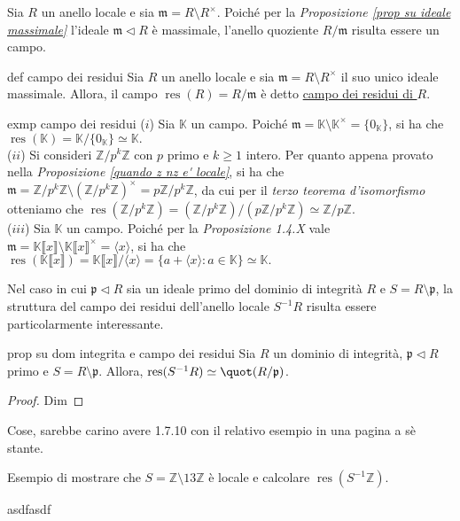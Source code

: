 \noindent Sia $R$ un anello locale e sia $\mathfrak{m}=R\setminus R^{\times}$. Poiché per la \emph{Proposizione \ref{prop su ideale massimale}} 
l'ideale $\mathfrak{m}\lhd R$ è massimale, l'anello quoziente $R/\mathfrak{m}$ risulta essere un campo.

\begin{defn}{def campo dei residui}
Sia $R$ un anello locale e sia $\mathfrak{m}=R\setminus R^{\times}$ il suo unico ideale massimale. Allora, il campo $\operatorname{res}(R)=R/\mathfrak{m}$ è detto \underline{campo dei residui di $R$}.
\end{defn}

\begin{example}[]{exmp campo dei residui}
  ($i$) Sia $\mathbb{K}$ un campo. Poiché $\mathfrak{m}=\mathbb{K}\setminus \mathbb{K}^{\times}=\{0_{\mathbb{K}}\}$, si ha che 
  $\operatorname{res}(\mathbb{K})=\mathbb{K}/\{0_{\mathbb{K}}\}\simeq \mathbb{K}.$\\

  \noindent ($ii$) Si consideri $\mathbb{Z}/p^k\mathbb{Z}$ con $p$ primo e $k\geq 1$ intero. Per quanto appena provato nella 
  \emph{Proposizione \ref{quando z nz e' locale}}, si ha che $\mathfrak{m}=\mathbb{Z}/p^k\mathbb{Z}\setminus 
  (\mathbb{Z}/p^k\mathbb{Z})^{\times}=p\mathbb{Z}/p^k\mathbb{Z}$, da cui per il \emph{terzo teorema d'isomorfismo} otteniamo che 
  $\operatorname{res}(\mathbb{Z}/p^k\mathbb{Z})=(\mathbb{Z}/p^k\mathbb{Z})/(p\mathbb{Z}/p^k\mathbb{Z})\simeq \mathbb{Z}/p\mathbb{Z}.$ \\

  \noindent ($iii$) Sia $\mathbb{K}$ un campo. Poiché per la \emph{Proposizione 1.4.X} vale 
  $\mathfrak{m}=\mathbb{K}\llbracket x\rrbracket\setminus\mathbb{K}\llbracket x\rrbracket^{\times}=\langle x \rangle$, si ha che 
  $\operatorname{res}(\mathbb{K}\llbracket x\rrbracket)=\mathbb{K}\llbracket x\rrbracket/\langle x\rangle = 
  \{a+\langle x\rangle : a\in \mathbb{K}\}\simeq \mathbb{K}.$
\end{example}

\noindent Nel caso in cui $\mathfrak{p}\lhd R$ sia un ideale primo del dominio di integrità $R$ e $S=R\setminus \mathfrak{p}$, 
la struttura del campo dei residui dell'anello locale $S^{-1}R$ risulta essere particolarmente interessante.

\begin{prop}[1.7.10]{prop su dom integrita e campo dei residui}
Sia $R$ un dominio di integrità, $\mathfrak{p}\lhd R$ primo e $S=R\setminus \mathfrak{p}$. Allora, $\operatorname{res}(S^{-1}R)\simeq \quot(R/\mathfrak{p})$.
\end{prop}
\vspace{-4mm}
\begin{proof}
Dim
\end{proof}

\noindent Cose, sarebbe carino avere 1.7.10 con il relativo esempio in una pagina a sè stante.

\begin{exm}Esempio di mostrare che $S=\mathbb{Z}\setminus 13\mathbb{Z}$ è locale e calcolare $\operatorname{res}(S^{-1}\mathbb{Z})$.\end{exm}
asdfasdf